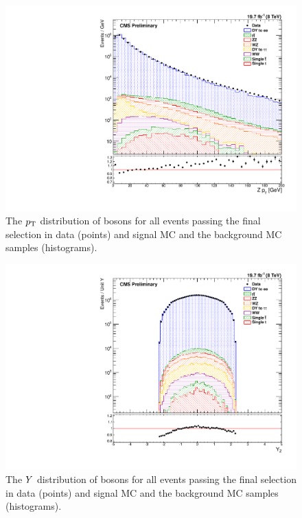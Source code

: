 \begin{figure}[!htbp]
    \centering
    \includegraphics[width=\textwidth]{figures/z_pt_powheg.pdf}
    \caption[
        The $\pt$ distribution of \Z bosons in data and MC with \POWHEG signal
        MC.
    ]{
        The $\pt$ distribution of \Z bosons for all events passing the final
        selection in data (points) and \POWHEG signal MC and the background
        MC samples (histograms).
    }
    \label{fig:z_pt_powheg}
\end{figure}

\begin{figure}[!htbp]
    \centering
    \includegraphics[width=\textwidth]{figures/z_rapidity.pdf}
    \caption[
        The $\rapidity$ distribution of \Z bosons in data and MC with \MADGRAPH
        signal MC.
    ]{
        The $\rapidity$ distribution of \Z bosons for all events passing the
        final selection in data (points) and \MADGRAPH signal MC and the
        background MC samples (histograms).
    }
    \label{fig:z_rapidity}
\end{figure}

